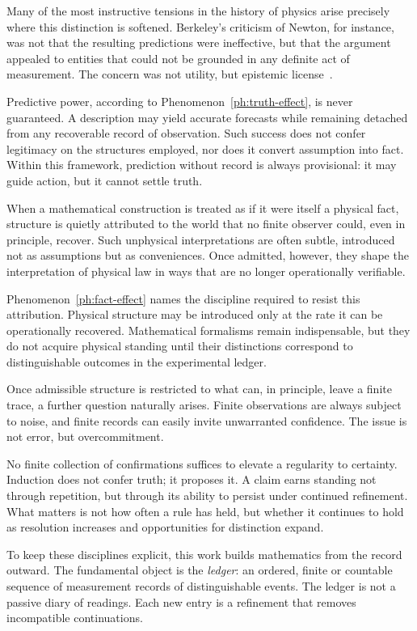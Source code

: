 Many of the most instructive tensions in the history of physics arise precisely
where this distinction is softened. Berkeley's criticism of Newton, for instance, 
was not that
the resulting predictions were ineffective, but that the argument appealed to
entities that could not be grounded in any definite act of measurement. The
concern was not utility, but epistemic license~\cite{berkeley1734}.  

Predictive power, according to Phenomenon~\ref{ph:truth-effect}, is never
guaranteed. A description may yield accurate forecasts while remaining detached
from any recoverable record of observation. Such success does not confer
legitimacy on the structures employed, nor does it convert assumption into fact.
Within this framework, prediction without record is always provisional: it may
guide action, but it cannot settle truth.

When a mathematical construction is treated as if it were itself a physical
fact, structure is quietly attributed to the world that no finite observer
could, even in principle, recover. Such unphysical interpretations  are often subtle, 
introduced not as assumptions but as conveniences. Once admitted, however, they shape the
interpretation of physical law in ways that are no longer operationally
verifiable.

Phenomenon~\ref{ph:fact-effect} names the discipline required to resist this
attribution. Physical structure may be introduced only at the rate it can be
operationally recovered. Mathematical formalisms remain indispensable, but they
do not acquire physical standing until their distinctions correspond to
distinguishable outcomes in the experimental ledger.

Once admissible structure is restricted to what can, in principle, leave a
finite trace, a further question naturally arises. Finite observations are
always subject to noise, and finite records can easily invite unwarranted
confidence. The issue is not error, but overcommitment.

No finite 
collection of
confirmations suffices to elevate a regularity to certainty. Induction does not
confer truth; it proposes it. A claim earns standing not through repetition,
but through its ability to persist under continued refinement. What matters is
not how often a rule has held, but whether it continues to hold as resolution
increases and opportunities for distinction expand.

To keep these disciplines explicit, this work builds mathematics from the
record outward. The fundamental object is the \emph{ledger}: an ordered,
finite or countable sequence of measurement records of distinguishable events. 
The ledger is not a
passive diary of readings. Each new entry is a refinement that removes
incompatible continuations.


